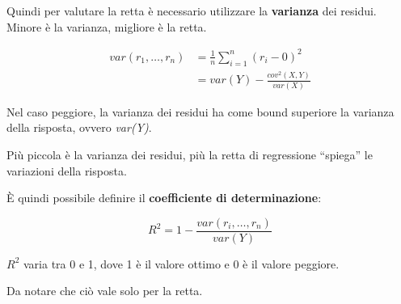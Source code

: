 Quindi per valutare la retta è necessario utilizzare la
\textbf{varianza} dei residui. Minore è la varianza, migliore è la
retta.

\begin{align*}
	var(r_1, \ldots, r_n) &= \frac{1}{n} \sum\limits_{i=1}^{n} (r_{i} - 0)^2 \\
									  &= var(Y) - \frac{cov^2(X,Y)}{var(X)}
\end{align*}

Nel caso peggiore, la varianza dei residui ha come bound superiore la
varianza della risposta, ovvero \emph{var(Y)}.

Più piccola è la varianza dei residui, più la retta di regressione ``spiega'' le variazioni della risposta.

È quindi possibile definire il \textbf{coefficiente di determinazione}:

$$
R^2 = 1 - \frac{var(r_i, \ldots, r_n)}{var(Y)}
$$

$R^2$ varia tra 0 e 1, dove 1 è il valore ottimo e 0 è il valore
peggiore.



Da notare che ciò vale solo per la retta.
